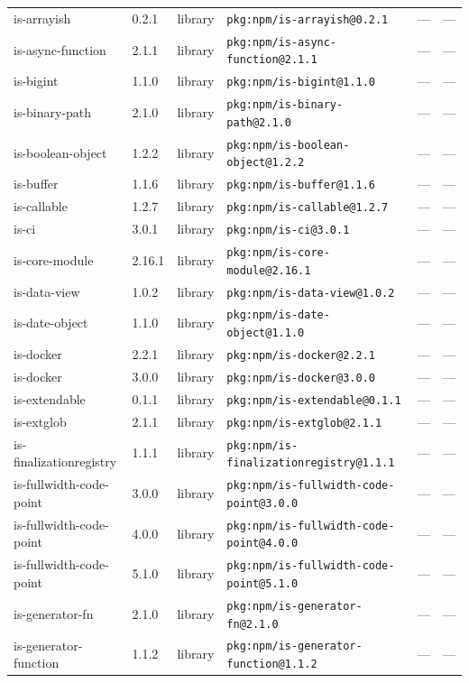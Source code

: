 \documentclass[11pt]{article}
\begin{document}
\begin{longtable}{|l|l|l|p{2.2cm}|l|p{4cm}|}
is-arrayish & 0.2.1 & library & \texttt{pkg:npm/is-arrayish@0.2.1} & — & — \\
is-async-function & 2.1.1 & library & \texttt{pkg:npm/is-async-function@2.1.1} & — & — \\
is-bigint & 1.1.0 & library & \texttt{pkg:npm/is-bigint@1.1.0} & — & — \\
is-binary-path & 2.1.0 & library & \texttt{pkg:npm/is-binary-path@2.1.0} & — & — \\
is-boolean-object & 1.2.2 & library & \texttt{pkg:npm/is-boolean-object@1.2.2} & — & — \\
is-buffer & 1.1.6 & library & \texttt{pkg:npm/is-buffer@1.1.6} & — & — \\
is-callable & 1.2.7 & library & \texttt{pkg:npm/is-callable@1.2.7} & — & — \\
is-ci & 3.0.1 & library & \texttt{pkg:npm/is-ci@3.0.1} & — & — \\
is-core-module & 2.16.1 & library & \texttt{pkg:npm/is-core-module@2.16.1} & — & — \\
is-data-view & 1.0.2 & library & \texttt{pkg:npm/is-data-view@1.0.2} & — & — \\
is-date-object & 1.1.0 & library & \texttt{pkg:npm/is-date-object@1.1.0} & — & — \\
is-docker & 2.2.1 & library & \texttt{pkg:npm/is-docker@2.2.1} & — & — \\
is-docker & 3.0.0 & library & \texttt{pkg:npm/is-docker@3.0.0} & — & — \\
is-extendable & 0.1.1 & library & \texttt{pkg:npm/is-extendable@0.1.1} & — & — \\
is-extglob & 2.1.1 & library & \texttt{pkg:npm/is-extglob@2.1.1} & — & — \\
is-finalizationregistry & 1.1.1 & library & \texttt{pkg:npm/is-finalizationregistry@1.1.1} & — & — \\
is-fullwidth-code-point & 3.0.0 & library & \texttt{pkg:npm/is-fullwidth-code-point@3.0.0} & — & — \\
is-fullwidth-code-point & 4.0.0 & library & \texttt{pkg:npm/is-fullwidth-code-point@4.0.0} & — & — \\
is-fullwidth-code-point & 5.1.0 & library & \texttt{pkg:npm/is-fullwidth-code-point@5.1.0} & — & — \\
is-generator-fn & 2.1.0 & library & \texttt{pkg:npm/is-generator-fn@2.1.0} & — & — \\
is-generator-function & 1.1.2 & library & \texttt{pkg:npm/is-generator-function@1.1.2} & — & — \\

\end{longtable}
\end{document}
